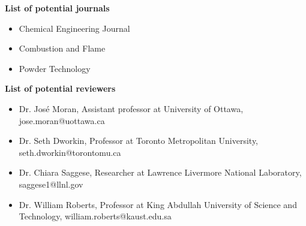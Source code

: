 \textbf{\large{List of potential journals}}
\vspace{0.3cm}
\begin{itemize}
	\item Chemical Engineering Journal
	\item Combustion and Flame
	\item Powder Technology
\end{itemize}

\vspace{1cm}
\textbf{\large{List of potential reviewers}}
\vspace{0.3cm}

\begin{itemize}
	\item Dr. José Moran, Assistant professor at University of Ottawa, jose.moran@uottawa.ca
	\item Dr. Seth Dworkin, Professor at Toronto Metropolitan University, seth.dworkin@torontomu.ca
	\item Dr. Chiara Saggese, Researcher at Lawrence Livermore National Laboratory, saggese1@llnl.gov
	\item Dr. William Roberts, Professor at King Abdullah University of Science and Technology, william.roberts@kaust.edu.sa
\end{itemize}